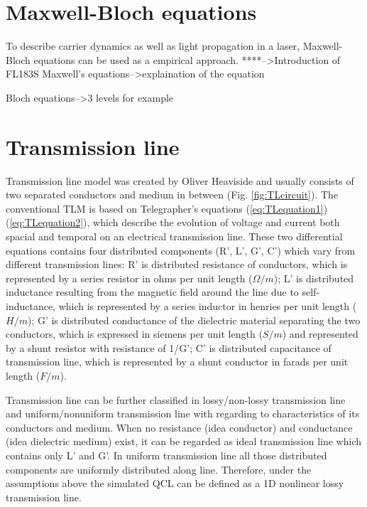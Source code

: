 \documentclass[11pt,final]{scrbook}
\begin{document}
\section{Maxwell-Bloch equations}
To describe carrier dynamics as well as light propagation in a laser, Maxwell-Bloch equations can be used as a empirical approach. 
****-->Introduction of FL183S
Maxwell's equations-->explaination of the equation

Bloch equations-->3 levels for example

\section{Transmission line}
Transmission line model was created by Oliver Heaviside \cite{heaviside2008electromagnetic} and usually consists of two separated conductors and medium in between (Fig. \ref{fig:TLcircuit}). The conventional TLM is based on Telegrapher's equations (\ref{eq:TLequation1})(\ref{eq:TLequation2}), which describe the evolution of voltage and current both spacial and temporal on an electrical transmission line. These two differential equations contains four distributed components (R', L', G', C') which vary from different transmission lines: R' is distributed resistance of conductors, which is represented by a series resistor in ohms per unit length ($\Omega /m$); L' is distributed inductance resulting from the magnetic field around the line due to self-inductance, which is represented by a series inductor in henries per unit length ($H/m$); G' is distributed conductance of the dielectric material separating the two conductors, which is expressed in siemens per unit length ($S/m$) and represented by a shunt resistor with resistance of 1/G'; C' is distributed capacitance of transmission line, which is represented by a shunt conductor in farads per unit length ($F/m$).

Transmission line can be further classified in lossy/non-lossy transmission line and uniform/nonuniform transmission line with regarding to characteristics of its conductors and medium. When no resistance (idea conductor) and conductance (idea dielectric medium) exist, it can be regarded as ideal transmission line which contains only L' and G'. In uniform transmission line all those distributed components are uniformly distributed along line. Therefore, under the assumptions above the simulated QCL can be defined as a 1D nonlinear lossy transmission line.
\end{document}

